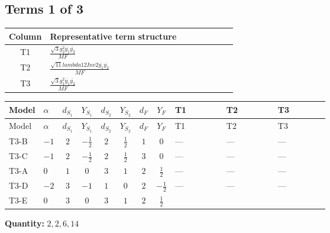 \documentclass[8pt]{article}
\begin{document}
\begin{landscape}
\subsection*{Terms 1 of 3}
\begin{center}
\begin{tabular}{@{}c >{\raggedright\arraybackslash}p{0.82\linewidth}@{}}
\toprule
Column & Representative term structure \\
\midrule
T1 & \(\displaystyle \frac{\sqrt{3} g_{2}^{2} \overline{y_{1}} \overline{y_{2}}}{MF}\) \\
\midrule
T2 & \(\displaystyle \frac{\sqrt{11} lambda12Inv2 \overline{y_{1}} \overline{y_{2}}}{MF}\) \\
\midrule
T3 & \(\displaystyle \frac{\sqrt{3} g_{1}^{2} \overline{y_{1}} \overline{y_{2}}}{MF}\) \\
\midrule
\bottomrule
\end{tabular}
\end{center}
\smallskip
\tiny
\begin{longtable}{@{}llcccccc >{\raggedright\arraybackslash}p{0.21\linewidth} >{\raggedright\arraybackslash}p{0.21\linewidth} >{\raggedright\arraybackslash}p{0.21\linewidth}@{}}
\toprule
Model & $\alpha$ & $d_{S_1}$ & $Y_{S_1}$ & $d_{S_2}$ & $Y_{S_2}$ & $d_F$ & $Y_F$ & T1 & T2 & T3 \\
\midrule
\endfirsthead
\toprule
Model & $\alpha$ & $d_{S_1}$ & $Y_{S_1}$ & $d_{S_2}$ & $Y_{S_2}$ & $d_F$ & $Y_F$ & T1 & T2 & T3 \\
\midrule
\endhead
T3-B & $-1$ & $2$ & $-\frac{1}{2}$ & $2$ & $\frac{1}{2}$ & $1$ & $0$ & --- & --- & --- \\
\midrule
T3-C & $-1$ & $2$ & $-\frac{1}{2}$ & $2$ & $\frac{1}{2}$ & $3$ & $0$ & --- & --- & --- \\
\midrule
T3-A & $0$ & $1$ & $0$ & $3$ & $1$ & $2$ & $\frac{1}{2}$ & --- & --- & --- \\
\midrule
T3-D & $-2$ & $3$ & $-1$ & $1$ & $0$ & $2$ & $-\frac{1}{2}$ & --- & --- & --- \\
\midrule
T3-E & $0$ & $3$ & $0$ & $3$ & $1$ & $2$ & $\frac{1}{2}$ & \scriptsize\adjustbox{max width=\linewidth}{$\begin{gathered} - \frac{49 \sqrt{3} g_{2}^{2} \overline{y_{1}} \overline{y_{2}}}{24 MF}\end{gathered}$} & \scriptsize\adjustbox{max width=\linewidth}{$\begin{gathered} - \frac{3 \sqrt{11} lambda12Inv2 \overline{y_{1}} \overline{y_{2}}}{22 MF}\end{gathered}$} & \scriptsize\adjustbox{max width=\linewidth}{$\begin{gathered} - \frac{\sqrt{3} g_{1}^{2} \overline{y_{1}} \overline{y_{2}}}{8 MF}\end{gathered}$} \\
\midrule
\bottomrule
\end{longtable}
\clearpage
\noindent\textbf{Quantity: }$\mathrm{2,2,6,14}$\par\smallskip

\end{landscape}
\end{document}
